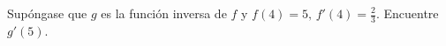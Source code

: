 \item Supóngase que $g$ es la función inversa de $f$ y $f(4) = 5, \, f'(4) = \frac{2}{3}$. Encuentre $g'(5)$.
